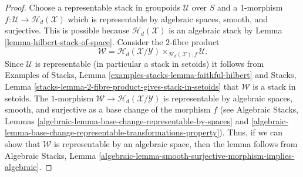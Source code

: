 \documentclass{stacks-project}
\theoremstyle{plain}
\theoremstyle{definition}
\theoremstyle{remark}
\numberwithin{equation}{subsection}
\begin{document}
\begin{proof}
Choose a representable stack in groupoids $\mathcal{U}$ over $S$ and a
$1$-morphism $f : \mathcal{U} \to \mathcal{H}_d(\mathcal{X})$
which is representable by algebraic spaces, smooth, and surjective.
This is possible because $\mathcal{H}_d(\mathcal{X})$ is an algebraic stack by
Lemma \ref{lemma-hilbert-stack-of-space}.
Consider the $2$-fibre product
$$
\mathcal{W} =
\mathcal{H}_d(\mathcal{X}/\mathcal{Y})
\times_{\mathcal{H}_d(\mathcal{X}), f}
\mathcal{U}.
$$
Since $\mathcal{U}$ is representable (in particular a stack in setoids)
it follows from
Examples of Stacks, Lemma \ref{examples-stacks-lemma-faithful-hilbert}
and
Stacks, Lemma \ref{stacks-lemma-2-fibre-product-gives-stack-in-setoids}
that $\mathcal{W}$ is a stack in setoids. The $1$-morphism
$\mathcal{W} \to \mathcal{H}_d(\mathcal{X}/\mathcal{Y})$ is
representable by algebraic spaces, smooth, and surjective as a base
change of the morphism $f$ (see
Algebraic Stacks,
Lemmas \ref{algebraic-lemma-base-change-representable-by-spaces} and
\ref{algebraic-lemma-base-change-representable-transformations-property}).
Thus, if we can show that $\mathcal{W}$ is representable by an algebraic space,
then the lemma follows from
Algebraic Stacks,
Lemma \ref{algebraic-lemma-smooth-surjective-morphism-implies-algebraic}.


\end{proof}
\end{document}
